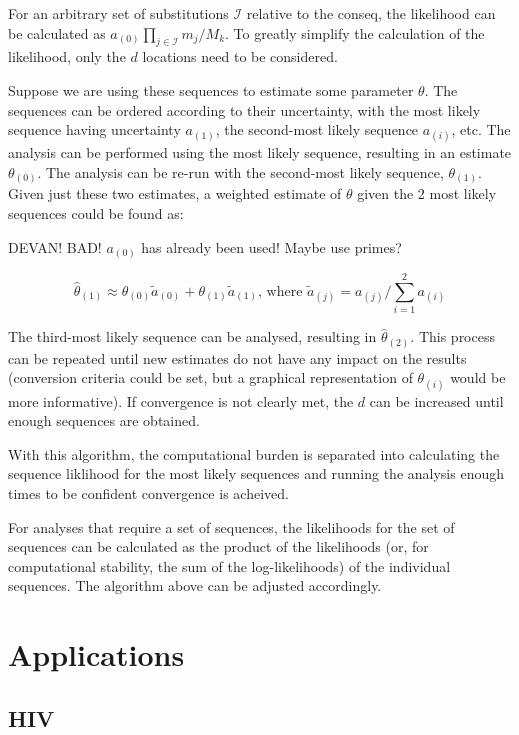 \documentclass[
]{article}
\begin{document}
For an arbitrary set of substitutions \(\mathcal{I}\) relative to the
conseq, the likelihood can be calculated as
\(a_{(0)}\prod_{j\in \mathcal{I}}m_j/M_k\). To greatly simplify the
calculation of the likelihood, only the \(d\) locations need to be
considered.

Suppose we are using these sequences to estimate some parameter
\(\theta\). The sequences can be ordered according to their uncertainty,
with the most likely sequence having uncertainty \(a_{(1)}\), the
second-most likely sequence \(a_{(i)}\), etc. The analysis can be
performed using the most likely sequence, resulting in an estimate
\(\theta_{(0)}\). The analysis can be re-run with the second-most likely
sequence, \(\theta_{(1)}\). Given just these two estimates, a weighted
estimate of \(\theta\) given the 2 most likely sequences could be found
as:

DEVAN! BAD! \(a_{(0)}\) has already been used! Maybe use primes?

\[
\hat\theta_{(1)} \approx \theta_{(0)} \tilde a_{(0)} + \theta_{(1)}\tilde a_{(1)}\text{, where }\tilde a_{(j)}=a_{(j)}/\sum_{i=1}^2a_{(i)}
\]

The third-most likely sequence can be analysed, resulting in
\(\hat\theta_{(2)}\). This process can be repeated until new estimates
do not have any impact on the results (conversion criteria could be set,
but a graphical representation of \(\theta_{(i)}\) would be more
informative). If convergence is not clearly met, the \(d\) can be
increased until enough sequences are obtained.

With this algorithm, the computational burden is separated into
calculating the sequence liklihood for the most likely sequences and
running the analysis enough times to be confident convergence is
acheived.

For analyses that require a set of sequences, the likelihoods for the
set of sequences can be calculated as the product of the likelihoods
(or, for computational stability, the sum of the log-likelihoods) of the
individual sequences. The algorithm above can be adjusted accordingly.

\hypertarget{applications}{%
\section{Applications}\label{applications}}

\hypertarget{hiv}{%
\subsection{HIV}\label{hiv}}
\end{document}
